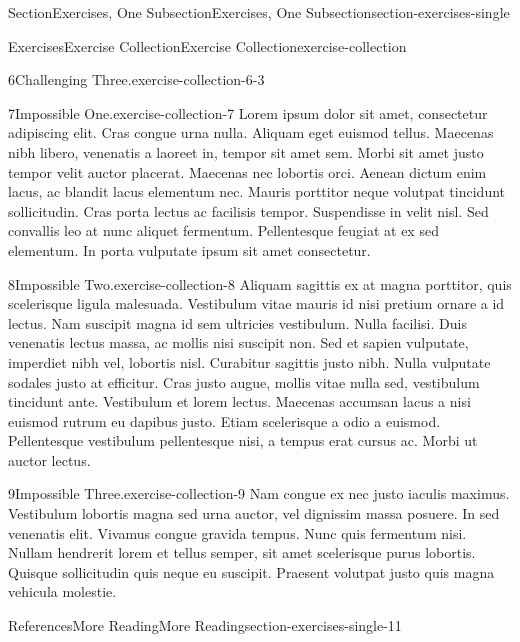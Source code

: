 \documentclass[twoside,10pt,]{article}
\numberwithin{equation}{section}
\begin{document}
\begin{sectionptx}{Section}{Exercises, One Subsection}{}{Exercises, One Subsection}{}{}{section-exercises-single}
\begin{exercises-subsection-numberless}{Exercises}{Exercise Collection}{}{Exercise Collection}{}{}{exercise-collection}
\begin{exercisegroup}
\begin{divisionexerciseeg}{6}{Challenging Three.}{}{exercise-collection-6-3}
\end{divisionexerciseeg}%
\end{exercisegroup}
\par\medskip\noindent
\begin{divisionexercise}{7}{Impossible One.}{}{exercise-collection-7}%
Lorem ipsum dolor sit amet, consectetur adipiscing elit. Cras congue urna nulla. Aliquam eget euismod tellus. Maecenas nibh libero, venenatis a laoreet in, tempor sit amet sem. Morbi sit amet justo tempor velit auctor placerat. Maecenas nec lobortis orci. Aenean dictum enim lacus, ac blandit lacus elementum nec. Mauris porttitor neque volutpat tincidunt sollicitudin. Cras porta lectus ac facilisis tempor. Suspendisse in velit nisl. Sed convallis leo at nunc aliquet fermentum. Pellentesque feugiat at ex sed elementum. In porta vulputate ipsum sit amet consectetur.%
\end{divisionexercise}%
\begin{divisionexercise}{8}{Impossible Two.}{}{exercise-collection-8}%
Aliquam sagittis ex at magna porttitor, quis scelerisque ligula malesuada. Vestibulum vitae mauris id nisi pretium ornare a id lectus. Nam suscipit magna id sem ultricies vestibulum. Nulla facilisi. Duis venenatis lectus massa, ac mollis nisi suscipit non. Sed et sapien vulputate, imperdiet nibh vel, lobortis nisl. Curabitur sagittis justo nibh. Nulla vulputate sodales justo at efficitur. Cras justo augue, mollis vitae nulla sed, vestibulum tincidunt ante. Vestibulum et lorem lectus. Maecenas accumsan lacus a nisi euismod rutrum eu dapibus justo. Etiam scelerisque a odio a euismod. Pellentesque vestibulum pellentesque nisi, a tempus erat cursus ac. Morbi ut auctor lectus.%
\end{divisionexercise}%
\begin{divisionexercise}{9}{Impossible Three.}{}{exercise-collection-9}%
Nam congue ex nec justo iaculis maximus. Vestibulum lobortis magna sed urna auctor, vel dignissim massa posuere. In sed venenatis elit. Vivamus congue gravida tempus. Nunc quis fermentum nisi. Nullam hendrerit lorem et tellus semper, sit amet scelerisque purus lobortis. Quisque sollicitudin quis neque eu suscipit. Praesent volutpat justo quis magna vehicula molestie.%
\end{divisionexercise}%
\end{exercises-subsection-numberless}
%
%
\typeout{************************************************}
\typeout{************************************************}
%
\begin{references-subsection-numberless}{References}{More Reading}{}{More Reading}{}{}{section-exercises-single-11}

\end{references-subsection-numberless}
\end{sectionptx}
\end{document}
